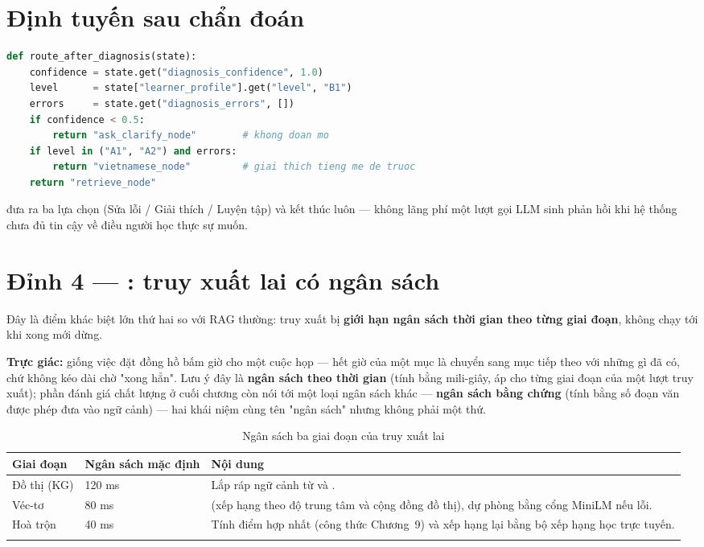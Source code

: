 \section{Định tuyến sau chẩn đoán}

\begin{lstlisting}[language=Python]
def route_after_diagnosis(state):
    confidence = state.get("diagnosis_confidence", 1.0)
    level      = state["learner_profile"].get("level", "B1")
    errors     = state.get("diagnosis_errors", [])
    if confidence < 0.5:
        return "ask_clarify_node"        # khong doan mo
    if level in ("A1", "A2") and errors:
        return "vietnamese_node"         # giai thich tieng me de truoc
    return "retrieve_node"
\end{lstlisting}

 đưa ra ba lựa chọn (Sửa lỗi / Giải thích / Luyện tập) và kết
thúc luôn — không lãng phí một lượt gọi LLM sinh phản hồi khi hệ thống chưa đủ tin cậy về
điều người học thực sự muốn.

\section{Đỉnh 4 — : truy xuất lai có ngân sách}

Đây là điểm khác biệt lớn thứ hai so với RAG thường: truy xuất bị \textbf{giới hạn ngân
sách thời gian theo từng giai đoạn}, không chạy tới khi xong mới dừng.

\textbf{Trực giác:} giống việc đặt đồng hồ bấm giờ cho một cuộc họp — hết giờ của một mục
là chuyển sang mục tiếp theo với những gì đã có, chứ không kéo dài chờ "xong hẳn". Lưu ý
đây là \textbf{ngân sách theo thời gian} (tính bằng mili-giây, áp cho từng giai đoạn của một
lượt truy xuất); phần đánh giá chất lượng ở cuối chương còn nói tới một loại ngân sách khác —
\textbf{ngân sách bằng chứng} (tính bằng số đoạn văn được phép đưa vào ngữ cảnh) — hai khái
niệm cùng tên "ngân sách" nhưng không phải một thứ.

\begin{longtable}{L{4.2cm} L{2.6cm} L{6.2cm}}
\toprule
\textbf{Giai đoạn} & \textbf{Ngân sách mặc định} & \textbf{Nội dung}\\
\midrule
\endhead
Đồ thị (KG) & 120 ms & Lắp ráp ngữ cảnh từ  và .\\
Véc-tơ & 80 ms &  (xếp hạng theo độ trung tâm và cộng đồng đồ thị), dự phòng bằng cổng MiniLM nếu lỗi.\\
Hoà trộn & 40 ms & Tính điểm hợp nhất (công thức Chương~9) và xếp hạng lại bằng bộ xếp hạng học trực tuyến.\\
\bottomrule
\caption{Ngân sách ba giai đoạn của truy xuất lai}
\end{longtable}

